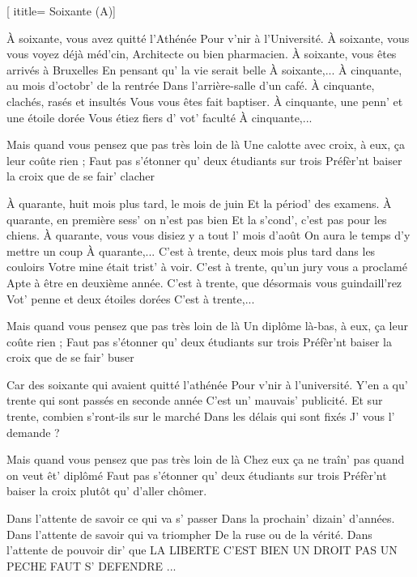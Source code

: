 [
ititle= {Soixante (A)}]


\beginverse
À soixante, vous avez quitté l'Athénée
Pour v'nir à l'Université.
À soixante, vous vous voyez déjà méd'cin,
Architecte ou bien pharmacien.
À soixante, vous êtes arrivés à Bruxelles
En pensant qu' la vie serait belle
À soixante,...
À cinquante, au mois d'octobr' de la rentrée
Dans l'arrière-salle d'un café.
À cinquante, clachés, rasés et insultés
Vous vous êtes fait baptiser.
À cinquante, une penn' et une étoile dorée
Vous étiez fiers d' vot' faculté
À cinquante,...
\endverse

\beginchorus
Mais quand vous pensez que pas très loin de là
Une calotte avec croix, à eux, ça leur coûte rien ;
Faut pas s'étonner qu' deux étudiants sur trois
Préfèr'nt baiser la croix que de se fair' clacher
\endchorus

\beginverse
À quarante, huit mois plus tard, le mois de juin
Et la périod' des examens.
À quarante, en première sess' on n'est pas bien
Et la s'cond', c'est pas pour les chiens.
À quarante, vous vous disiez y a tout l' mois d'août
On aura le temps d'y mettre un coup
À quarante,...
C'est à trente, deux mois plus tard dans les couloirs
Votre mine était trist' à voir.
C'est à trente, qu'un jury vous a proclamé
Apte à être en deuxième année.
C'est à trente, que désormais vous guindaill'rez
Vot' penne et deux étoiles dorées
C'est à trente,...
\endverse

\beginchorus
Mais quand vous pensez que pas très loin de là
Un diplôme là-bas, à eux, ça leur coûte rien ;
Faut pas s'étonner qu' deux étudiants sur trois
Préfèr'nt baiser la croix que de se fair' buser
\endchorus

\beginverse
Car des soixante qui avaient quitté l'athénée
Pour v'nir à l'université.
Y'en a qu' trente qui sont passés en seconde année
C'est un' mauvais' publicité.
Et sur trente, combien s'ront-ils sur le marché
Dans les délais qui sont fixés
J' vous l' demande ?
\endverse

\beginchorus
Mais quand vous pensez que pas très loin de là
Chez eux ça ne traîn' pas quand on veut êt' diplômé
Faut pas s'étonner qu' deux étudiants sur trois
Préfèr'nt baiser la croix plutôt qu' d'aller chômer.
\endchorus

\beginverse
Dans l'attente de savoir ce qui va s' passer
Dans la prochain' dizain' d'années.
Dans l'attente de savoir qui va triompher
De la ruse ou de la vérité.
Dans l'attente de pouvoir dir' que LA LIBERTE
C'EST BIEN UN DROIT PAS UN PECHE
FAUT S' DEFENDRE ...
\endverse

\endsong